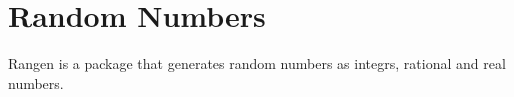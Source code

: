\documentclass{tufte-book}
\begin{document}
\chapter{Random Numbers}

Rangen is a package that generates random numbers as integrs, rational and real numbers.


\end{document}
